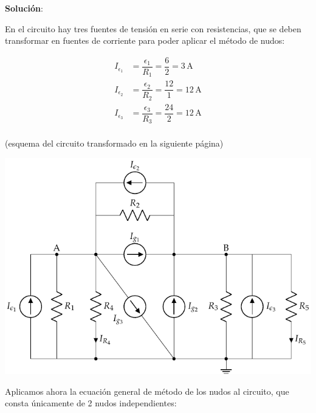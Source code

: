 \documentclass[10pt]{article}
\begin{document}
\vspace{7mm}

\hrulefill

\vspace{8mm}
\textbf{Solución}:
\vspace{4mm}

En el circuito hay tres fuentes de tensión en serie con resistencias, que se deben transformar en fuentes de corriente para poder aplicar el método de nudos:

\begin{align*}
    I_{\epsilon_1}&=\dfrac{\epsilon_1}{R_1}=\dfrac{6}{2}=3\,\text{A}\\
    I_{\epsilon_2}&=\dfrac{\epsilon_2}{R_2}=\dfrac{12}{1}=12\,\text{A}\\
    I_{\epsilon_3}&=\dfrac{\epsilon_3}{R_3}=\dfrac{24}{2}=12\,\text{A}\\
\end{align*}

\vspace{-2mm}
\begin{center}
    (esquema del circuito transformado en la siguiente página)
\end{center}

\begin{center}
    \includegraphics[scale=1.2]{figs/nudos_fuentes2.pdf}
\end{center}

\vspace{2mm}
Aplicamos ahora la ecuación general de método de los nudos al circuito, que consta únicamente de 2 nudos independientes:
\end{document}
